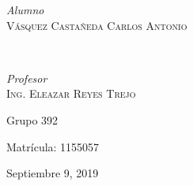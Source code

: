 \documentclass[12pt, letterpaper]{article}
\begin{document}
\begin{titlepage}
{	\begin{minipage}{0.4\textwidth}
		\begin{flushleft}
			\large
			\textit{Alumno}\\
			\textsc{Vásquez Castañeda Carlos Antonio} %
		\end{flushleft}
	\end{minipage}
	~
	\begin{minipage}{0.4\textwidth}
		\begin{flushright}
			\large
			\textit{Profesor}\\
			\textsc{Ing. Eleazar Reyes Trejo} %
		\end{flushright}
	\end{minipage}
	
	
	
	\vfill
	{\large Grupo 392}

	{\large Matrícula: 1155057}
	\vfill
	\vfill %
	
	{\large Septiembre 9, 2019} %
	
	
	 
	
	\vfill %
}	
\end{titlepage}

\end{document}
